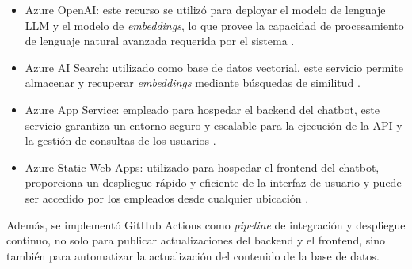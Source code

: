 \begin{itemize}
	\item Azure OpenAI: este recurso se utilizó para deployar el modelo de lenguaje LLM y el modelo de \textit{embeddings}, 
	lo que provee la capacidad de procesamiento de lenguaje natural avanzada requerida por el sistema \citep{website:azure-openai}.
	\item Azure AI Search: utilizado como base de datos vectorial, este servicio permite almacenar y recuperar \textit{embeddings} 
	mediante búsquedas de similitud \citep{website:ai-search}.
	\item Azure App Service: empleado para hospedar el backend del chatbot, este servicio garantiza un entorno seguro y 
	escalable para la ejecución de la API y la gestión de consultas de los usuarios \citep{website:app-service}.
	\item Azure Static Web Apps: utilizado para hospedar el frontend del chatbot, proporciona un despliegue 
	rápido y eficiente de la interfaz de usuario y puede ser accedido por los empleados desde cualquier ubicación \citep{website:static-web-app}.
\end{itemize}

Además, se implementó GitHub Actions \citep{website:github-actions} como \textit{pipeline} de integración y despliegue continuo, no solo para publicar 
actualizaciones del backend y el frontend, sino también para automatizar la actualización del contenido de la base de datos.